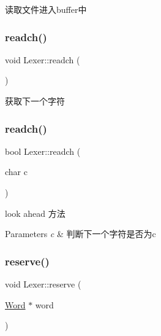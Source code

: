 读取文件进入buffer中 

\mbox{\label{class_lexer_a5c91a26ad6b4294bf7bb8d4c46ea529b}} 
\subsubsection{\texorpdfstring{readch()}{readch()}\hspace{0.1cm}{\footnotesize\ttfamily [1/2]}}
{\footnotesize\ttfamily void Lexer\+::readch (\begin{DoxyParamCaption}{ }\end{DoxyParamCaption})}



获取下一个字符 

\mbox{\label{class_lexer_acbe68a5d98ebc3b3a87fd27f000030a5}} 
\subsubsection{\texorpdfstring{readch()}{readch()}\hspace{0.1cm}{\footnotesize\ttfamily [2/2]}}
{\footnotesize\ttfamily bool Lexer\+::readch (\begin{DoxyParamCaption}\item[{char}]{c }\end{DoxyParamCaption})}



look ahead 方法 


\begin{DoxyParams}{Parameters}
{\em c} & 判断下一个字符是否为c \\
\hline
\end{DoxyParams}
\mbox{\label{class_lexer_ae96c693bf6eba38f21adab5fc94c18b1}} 
\subsubsection{\texorpdfstring{reserve()}{reserve()}}
{\footnotesize\ttfamily void Lexer\+::reserve (\begin{DoxyParamCaption}\item[{\hyperlink{class_word}{Word} $\ast$}]{word }\end{DoxyParamCaption})}



